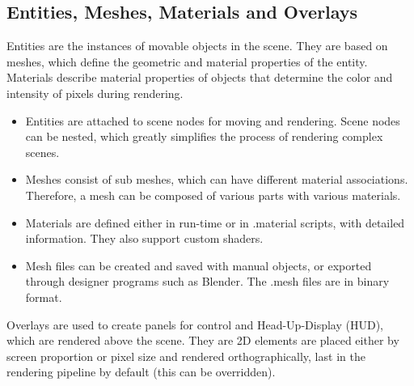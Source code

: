 \subsection{Entities, Meshes, Materials and Overlays}
Entities are the instances of movable objects in the scene. They are based on meshes, which define the geometric and material properties of the entity. Materials describe material properties of objects that determine the color and intensity of pixels during rendering.
 
\begin{itemize}
\item Entities are attached to scene nodes for moving and rendering. Scene nodes can be nested, which greatly simplifies the process of rendering complex scenes.
\item Meshes consist of sub meshes, which can have different material associations. Therefore, a mesh can be composed of various parts with various materials.
\item Materials are defined either in run-time or in .material scripts, with detailed information. They also support custom shaders.
\item Mesh files can be created and saved with manual objects, or exported through designer programs such as Blender. The .mesh files are in binary format.
\end{itemize}
Overlays are used to create panels for control and Head-Up-Display (HUD), which are rendered above the scene. They are 2D elements are placed either by screen proportion or pixel size and rendered orthographically, last in the rendering pipeline by default (this can be overridden).
